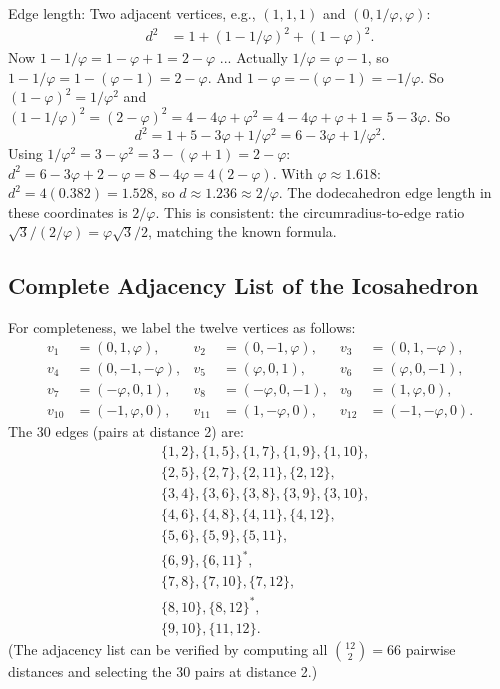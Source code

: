 Edge length: Two adjacent vertices, e.g., $(1,1,1)$ and $(0,1/\varphi,\varphi)$:
\begin{align*}
  d^2 &= 1 + (1-1/\varphi)^2 + (1-\varphi)^2.
\end{align*}
Now $1 - 1/\varphi = 1 - \varphi + 1 = 2-\varphi$ ... Actually $1/\varphi = \varphi - 1$,
so $1 - 1/\varphi = 1 - (\varphi-1) = 2-\varphi$.  And $1-\varphi = -({\varphi-1}) = -1/\varphi$.
So $(1-\varphi)^2 = 1/\varphi^2$ and $(1-1/\varphi)^2 = (2-\varphi)^2 = 4-4\varphi+\varphi^2
= 4-4\varphi+\varphi+1 = 5-3\varphi$.  So
\[
  d^2 = 1 + 5-3\varphi + 1/\varphi^2 = 6-3\varphi + 1/\varphi^2.
\]
Using $1/\varphi^2 = 3-\varphi^2 = 3-(\varphi+1) = 2-\varphi$:
$d^2 = 6-3\varphi+2-\varphi = 8-4\varphi = 4(2-\varphi)$.
With $\varphi \approx 1.618$: $d^2 = 4(0.382) = 1.528$, so $d \approx 1.236 \approx 2/\varphi$.
The dodecahedron edge length in these coordinates is $2/\varphi$.  This is
consistent: the circumradius-to-edge ratio $\sqrt{3}/(2/\varphi) = \varphi\sqrt{3}/2$,
matching the known formula.

\subsection{Complete Adjacency List of the Icosahedron}
\label{subsec:icosa-adjacency}

For completeness, we label the twelve vertices as follows:
\begin{align*}
  v_1 &= (0,1,\varphi),  & v_2 &= (0,-1,\varphi), & v_3 &= (0,1,-\varphi), \\
  v_4 &= (0,-1,-\varphi), & v_5 &= (\varphi,0,1),  & v_6 &= (\varphi,0,-1), \\
  v_7 &= (-\varphi,0,1), & v_8 &= (-\varphi,0,-1), & v_9 &= (1,\varphi,0), \\
  v_{10} &= (-1,\varphi,0), & v_{11} &= (1,-\varphi,0), & v_{12} &= (-1,-\varphi,0).
\end{align*}
The 30 edges (pairs at distance 2) are:
\begin{align*}
  &\{1,2\},\{1,5\},\{1,7\},\{1,9\},\{1,10\}, \\
  &\{2,5\},\{2,7\},\{2,11\},\{2,12\}, \\
  &\{3,4\},\{3,6\},\{3,8\},\{3,9\},\{3,10\}, \\
  &\{4,6\},\{4,8\},\{4,11\},\{4,12\}, \\
  &\{5,6\},\{5,9\},\{5,11\}, \\
  &\{6,9\},\{6,11\}^*, \\
  &\{7,8\},\{7,10\},\{7,12\}, \\
  &\{8,10\},\{8,12\}^*, \\
  &\{9,10\},\{11,12\}.
\end{align*}
(The adjacency list can be verified by computing all $\binom{12}{2} = 66$ pairwise
distances and selecting the 30 pairs at distance 2.)

